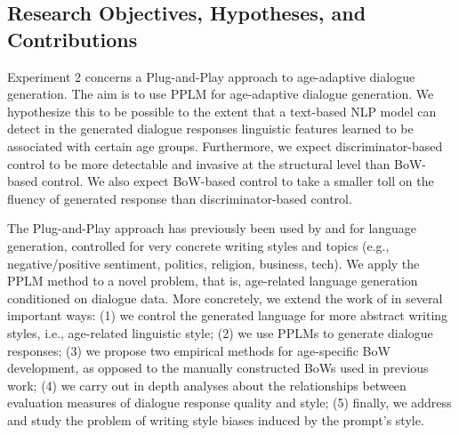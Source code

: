 \subsection{Research Objectives, Hypotheses, and Contributions}

Experiment 2 concerns a Plug-and-Play approach to age-adaptive dialogue generation.
The aim is to use PPLM for age-adaptive dialogue generation. We hypothesize this to be possible to the extent that a text-based NLP model can detect in the generated dialogue responses linguistic features learned to be associated with certain age groups. Furthermore, we expect discriminator-based control to be more detectable and invasive at the structural level than BoW-based control. We also expect BoW-based control to take a smaller toll on the fluency of generated response than discriminator-based control.


The Plug-and-Play approach has previously been used by \cite{dathathri2019plug} and \cite{madotto-etal-2020-plug} for language generation, controlled for very concrete writing styles and topics (e.g., negative/positive sentiment, politics, religion, business, tech). We apply the PPLM method to a novel problem, that is, age-related language generation conditioned on dialogue data. More concretely, we extend the work of \cite{dathathri2019plug} in several important ways: (1) we control the generated language for more abstract writing styles, i.e., age-related linguistic style; (2) we use PPLMs to generate dialogue responses; (3) we propose two empirical methods for age-specific BoW development, as opposed to the manually constructed BoWs used in previous work; (4) we carry out in depth analyses about the relationships between evaluation measures of dialogue response quality and style; (5) finally, we address and study the problem of writing style biases induced by the prompt's style.

